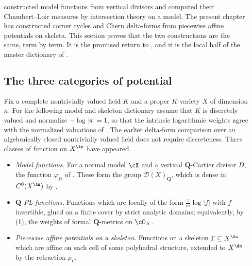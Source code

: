  constructed model functions from vertical divisors and
computed their Chambert--Loir measures by intersection theory on a model.
The present chapter has constructed corner cycles and Chern delta-forms from
piecewise affine potentials on skeleta.  This section proves that the two
constructions are the same, term by term.  It is the promised return to
, and it is the local half of the master dictionary of
.

\subsection{The three categories of potential}
\label{sec:ch18-three-potentials}

Fix a complete nontrivially valued field $K$ and a proper $K$-variety $X$ of
dimension $n$.  For the following model and skeleton dictionary assume
that $K$ is discretely valued and normalize $-\log|\pi|=1$, so that the
intrinsic logarithmic weights agree with the normalized valuations of
.  The earlier delta-form comparison over an
algebraically closed nontrivially valued field does not require discreteness.
Three classes of function on $X^{\An}$ have appeared.

\begin{itemize}
\item \emph{Model functions.}  For a normal model $\cX$ and a vertical
 $\mathbf Q$-Cartier divisor $D$, the function $\varphi_D$ of
 .  These form the group
 $\mathcal D(X)_{\mathbf Q}$, which is dense in $C^0(X^{\An})$ by
 .
\item \emph{$\mathbf Q$-PL functions.}  Functions which are locally of the
 form $\frac1m\log|f|$ with $f$ invertible, glued on a finite cover by
 strict analytic domains; equivalently, by
 \,(1), the weights of formal
 $\mathbf Q$-metrics on $\cO_X$.
\item \emph{Piecewise affine potentials on a skeleton.}  Functions on a
 skeleton $\Gamma\subseteq X^{\An}$ which are affine on each cell of some
 polyhedral structure, extended to $X^{\An}$ by the retraction
 $\rho_\Gamma$.
\end{itemize}

